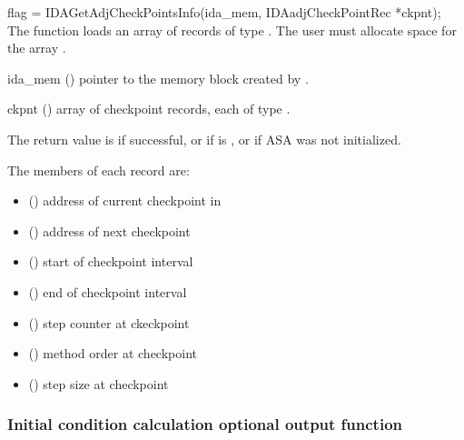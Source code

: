 {
  flag = IDAGetAdjCheckPointsInfo(ida\_mem, IDAadjCheckPointRec *ckpnt);
}
{
  The function  loads an array of 
  records of type .
  The user must allocate space for the array .
}
{
  \begin{args}
  \item[ida\_mem] ()
    pointer to the {\idas} memory block created by .
  \item[ckpnt] ()
    array of  checkpoint records, each of type .
  \end{args}
}
{  The return value is  if successful, or
    if  is , or
    if ASA was not initialized.}
{  The members of each record  are:
\begin{itemize}
 \item {} () address of current checkpoint
        in 
 \item {} () address of next checkpoint
 \item {} () start of checkpoint interval
 \item {} () end of checkpoint interval
 \item {} () step counter at ckeckpoint 
 \item {} () method order at checkpoint 
 \item {} () step size at checkpoint 
\end{itemize}
}


\subsubsection{Initial condition calculation optional output function}
\label{sss:optout_iccalcB}

